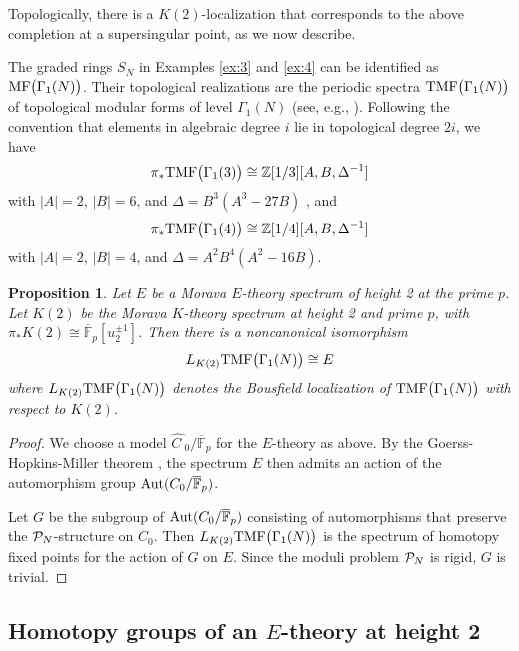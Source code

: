 \documentclass{gtpart}
\newtheorem{prop}[thm]{Proposition}
\theoremstyle{definition}
\theoremstyle{remark}
\newcommand{\mb}[1]{\mathbb{#1}}
\newcommand{\Aut}{{\rm Aut}}
\newcommand{\cF}{\overline {\mb F}}
\newcommand{\CP}{{\cal P}}
\newcommand{\BZ}{{\mb Z}}
\newcommand{\HC}{\widehat{C~}\!}
\newcommand{\TMF}{{\rm TMF}}
\newcommand{\MF}{{\rm MF}}
\renewcommand{\D}{\Delta}
\newcommand{\G}{\Gamma}
\renewcommand{\=}{\approx}
\renewcommand{\-}{\sim}
\numberwithin{equation}{section}
\numberwithin{thm}{section}
\begin{document}
Topologically, there is a $K(2)$-localization that corresponds to the above completion at a supersingular point, as we now describe.  

The graded rings $S_N$ in Examples \ref{ex:3} and \ref{ex:4} 
can be identified as $\MF\big(\G_1(N)\big)$.  
Their topological realizations are the periodic spectra $\TMF\big(\G_1(N)\big)$ of topological modular forms of level $\G_1(N)$ (see, e.g., \cite{tmf3,logetaletmf}).  
Following the convention that elements in algebraic degree $i$ lie in topological degree $2 i$, we have 
\[
 \pi_* \TMF\big(\G_1(3)\big) \cong \BZ[1/3][A, B, \D^{-1}] 
\]
with $|A| = 2$, $|B| = 6$, and $\D = B^3 (A^3 - 27 B)$ \cite[Corollary 3.3]{tmf3}, and 
\[
 \pi_* \TMF\big(\G_1(4)\big) \cong \BZ[1/4][A, B, \D^{-1}] 
\]
with $|A| = 2$, $|B| = 4$, and $\D = A^2 B^4 (A^2 - 16 B)$.  
\begin{prop}
 \label{prop:tmfe}
 Let $E$ be a Morava $E$-theory spectrum of height 2 at the prime $p$.  
 Let $K(2)$ be the Morava $K$-theory spectrum at height 2 and prime $p$, with $\pi_* K(2) \cong \cF_p [u_2^{\pm 1}]$.  
 Then there is a noncanonical isomorphism 
 \[
  L_{K(2)} \TMF\big(\G_1(N)\big) \cong E 
 \]
 where $L_{K(2)} \TMF\big(\G_1(N)\big)$ denotes the Bousfield localization of $\TMF\big(\G_1(N)\big)$ with respect to $K(2)$.  
\end{prop}
\begin{proof}
 We choose a model $\HC_0 / \cF_p$ for the $E$-theory as above.  
 By the Goerss-Hopkins-Miller theorem \cite[Corollary 7.6]{GH}, 
 the spectrum $E$ then admits an action of the automorphism group $\Aut(C_0 / \cF_p)$.  

 Let $G$ be the subgroup of $\Aut(C_0 / \cF_p)$ consisting of automorphisms that preserve the $\CP_N$-structure on $C_0$.  
 Then $L_{K(2)} \TMF\big(\G_1(N)\big)$ is the spectrum of homotopy fixed points for the action of $G$ on $E$.  
 Since the moduli problem $\CP_N$ is rigid, $G$ is trivial.  
\end{proof}



\subsection{Homotopy groups of an $E$-theory at height 2}
\label{subsec:mfe0}
\end{document}
